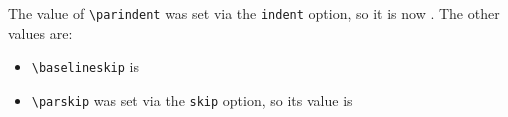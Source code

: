\documentclass{article}
\begin{document}
	
	\blindtext[1]\par %
	\blindtext[1]
	
	The value of \verb|\parindent| was set via the \texttt{indent} option, so it is now \texttt{\the\parindent}. The other values are:
	
	\begin{itemize}
		\item \verb|\baselineskip| is \texttt{\the\baselineskip}
		\item \verb|\parskip| was set via the \texttt{skip} option, so its value is \texttt{\the\parskip}
	\end{itemize}
\end{document}
